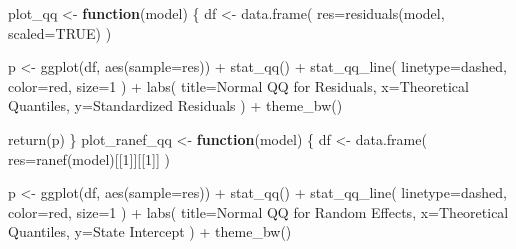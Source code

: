 \documentclass[
  11pt,
]{article}
\newenvironment{Shaded}{\begin{snugshade}}{\end{snugshade}}
\newcommand{\AttributeTok}[1]{\textcolor[rgb]{0.77,0.63,0.00}{#1}}
\newcommand{\ConstantTok}[1]{\textcolor[rgb]{0.00,0.00,0.00}{#1}}
\newcommand{\ControlFlowTok}[1]{\textcolor[rgb]{0.13,0.29,0.53}{\textbf{#1}}}
\newcommand{\DecValTok}[1]{\textcolor[rgb]{0.00,0.00,0.81}{#1}}
\newcommand{\FunctionTok}[1]{\textcolor[rgb]{0.00,0.00,0.00}{#1}}
\newcommand{\NormalTok}[1]{#1}
\newcommand{\OtherTok}[1]{\textcolor[rgb]{0.56,0.35,0.01}{#1}}
\newcommand{\SpecialCharTok}[1]{\textcolor[rgb]{0.00,0.00,0.00}{#1}}
\newcommand{\StringTok}[1]{\textcolor[rgb]{0.31,0.60,0.02}{#1}}
\begin{document}
\begin{Shaded}
\begin{Highlighting}[]
\NormalTok{plot\_qq }\OtherTok{\textless{}{-}} \ControlFlowTok{function}\NormalTok{(model) \{}
\NormalTok{  df }\OtherTok{\textless{}{-}} \FunctionTok{data.frame}\NormalTok{(}
    \AttributeTok{res=}\FunctionTok{residuals}\NormalTok{(model, }\AttributeTok{scaled=}\ConstantTok{TRUE}\NormalTok{)}
\NormalTok{  )}

\NormalTok{  p }\OtherTok{\textless{}{-}} \FunctionTok{ggplot}\NormalTok{(df, }\FunctionTok{aes}\NormalTok{(}\AttributeTok{sample=}\NormalTok{res)) }\SpecialCharTok{+}
    \FunctionTok{stat\_qq}\NormalTok{() }\SpecialCharTok{+}
    \FunctionTok{stat\_qq\_line}\NormalTok{(}
      \AttributeTok{linetype=}\StringTok{\textquotesingle{}dashed\textquotesingle{}}\NormalTok{,}
      \AttributeTok{color=}\StringTok{\textquotesingle{}red\textquotesingle{}}\NormalTok{,}
      \AttributeTok{size=}\DecValTok{1}
\NormalTok{    ) }\SpecialCharTok{+}
    \FunctionTok{labs}\NormalTok{(}
      \AttributeTok{title=}\StringTok{\textquotesingle{}Normal QQ for Residuals\textquotesingle{}}\NormalTok{,}
      \AttributeTok{x=}\StringTok{\textquotesingle{}Theoretical Quantiles\textquotesingle{}}\NormalTok{,}
      \AttributeTok{y=}\StringTok{\textquotesingle{}Standardized Residuals\textquotesingle{}}
\NormalTok{    ) }\SpecialCharTok{+} \FunctionTok{theme\_bw}\NormalTok{()}

  \FunctionTok{return}\NormalTok{(p)}
\NormalTok{\}}
\NormalTok{plot\_ranef\_qq }\OtherTok{\textless{}{-}} \ControlFlowTok{function}\NormalTok{(model) \{}
\NormalTok{  df }\OtherTok{\textless{}{-}} \FunctionTok{data.frame}\NormalTok{(}
    \AttributeTok{res=}\FunctionTok{ranef}\NormalTok{(model)[[}\DecValTok{1}\NormalTok{]][[}\DecValTok{1}\NormalTok{]]}
\NormalTok{  )}

\NormalTok{  p }\OtherTok{\textless{}{-}} \FunctionTok{ggplot}\NormalTok{(df, }\FunctionTok{aes}\NormalTok{(}\AttributeTok{sample=}\NormalTok{res)) }\SpecialCharTok{+}
    \FunctionTok{stat\_qq}\NormalTok{() }\SpecialCharTok{+}
    \FunctionTok{stat\_qq\_line}\NormalTok{(}
      \AttributeTok{linetype=}\StringTok{\textquotesingle{}dashed\textquotesingle{}}\NormalTok{,}
      \AttributeTok{color=}\StringTok{\textquotesingle{}red\textquotesingle{}}\NormalTok{,}
      \AttributeTok{size=}\DecValTok{1}
\NormalTok{    ) }\SpecialCharTok{+}
    \FunctionTok{labs}\NormalTok{(}
      \AttributeTok{title=}\StringTok{\textquotesingle{}Normal QQ for Random Effects\textquotesingle{}}\NormalTok{,}
      \AttributeTok{x=}\StringTok{\textquotesingle{}Theoretical Quantiles\textquotesingle{}}\NormalTok{,}
      \AttributeTok{y=}\StringTok{\textquotesingle{}State Intercept\textquotesingle{}}
\NormalTok{    ) }\SpecialCharTok{+} \FunctionTok{theme\_bw}\NormalTok{()}


\end{Highlighting}
\end{Shaded}
\end{document}
